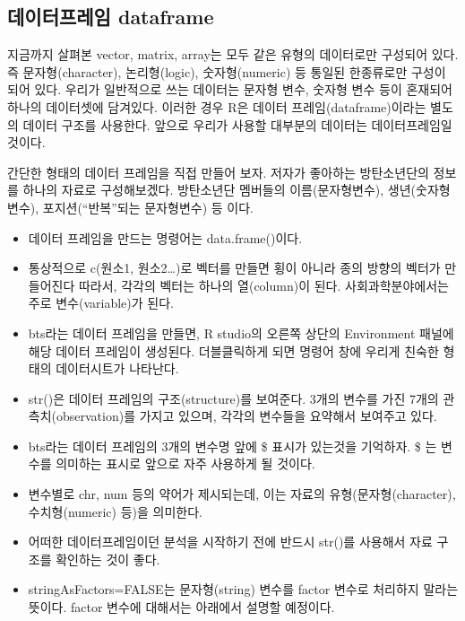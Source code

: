 \documentclass[
]{book}
\providecommand{\tightlist}{%
  \setlength{\itemsep}{0pt}\setlength{\parskip}{0pt}}
\begin{document}
\subsection{데이터프레임 dataframe}\label{uxb370uxc774uxd130uxd504uxb808uxc784-dataframe}

지금까지 살펴본 vector, matrix, array는 모두 같은 유형의 데이터로만 구성되어 있다. 즉 문자형(character), 논리형(logic), 숫자형(numeric) 등 통일된 한종류로만 구성이 되어 있다. 우리가 일반적으로 쓰는 데이터는 문자형 변수, 숫자형 변수 등이 혼재되어 하나의 데이터셋에 담겨있다. 이러한 경우 R은 데이터 프레임(dataframe)이라는 별도의 데이터 구조를 사용한다. 앞으로 우리가 사용할 대부분의 데이터는 데이터프레임일 것이다.

간단한 형태의 데이터 프레임을 직접 만들어 보자. 저자가 좋아하는 방탄소년단의 정보를 하나의 자료로 구성해보겠다. 방탄소년단 멤버들의 이름(문자형변수), 생년(숫자형 변수), 포지션(``반복''되는 문자형변수) 등 이다.

\begin{itemize}
\tightlist
\item
  데이터 프레임을 만드는 명령어는 data.frame()이다.
\item
  통상적으로 c(원소1, 원소2\ldots)로 벡터를 만들면 횡이 아니라 종의 방향의 벡터가 만들어진다 따라서, 각각의 벡터는 하나의 열(column)이 된다. 사회과학분야에서는 주로 변수(variable)가 된다.
\item
  bts라는 데이터 프레임을 만들면, R studio의 오른쪽 상단의 Environment 패널에 해당 데이터 프레임이 생성된다. 더블클릭하게 되면 명령어 창에 우리게 친숙한 형태의 데이터시트가 나타난다.
\item
  str()은 데이터 프레임의 구조(structure)를 보여준다. 3개의 변수를 가진 7개의 관측치(observation)를 가지고 있으며, 각각의 변수들을 요약해서 보여주고 있다.
\item
  bts라는 데이터 프레임의 3개의 변수명 앞에 \$ 표시가 있는것을 기억하자. \$ 는 변수를 의미하는 표시로 앞으로 자주 사용하게 될 것이다.
\item
  변수별로 chr, num 등의 약어가 제시되는데, 이는 자료의 유형(문자형(character), 수치형(numeric) 등)을 의미한다.
\item
  어떠한 데이터프레임이던 분석을 시작하기 전에 반드시 str()를 사용해서 자료 구조를 확인하는 것이 좋다.
\item
  stringAsFactors=FALSE는 문자형(string) 변수를 factor 변수로 처리하지 말라는 뜻이다. factor 변수에 대해서는 아래에서 설명할 예정이다.
\end{itemize}
\end{document}
